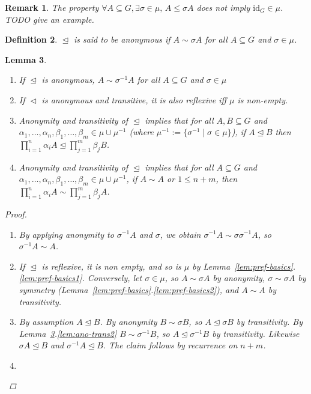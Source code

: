 \documentclass[11pt]{article}
\newtheorem{definition}{Definition}
\newtheorem{lemma}[definition]{Lemma}
\newtheorem{remark}[definition]{Remark}
\newcommand{\releq}{\mathrel{\trianglelefteq}}
\newcommand{\rel}{\mathrel{\triangleleft}}
\begin{document}
\begin{remark}
The property $\forall A \subseteq G, \exists \sigma \in \mu,\, A \leq \sigma A$ does not imply $\mathrm{id}_G \in \mu$. TODO give an example.
\end{remark}


\begin{definition}
 $\releq$ is said to be anonymous if $A \sim \sigma A$ for all $A \subseteq G$ and $\sigma \in \mu$.
\end{definition}


\begin{lemma}\label{lem:ano-trans}
\begin{enumerate}
 \item\label{lem:ano-trans1} If $\releq$ is anonymous, $A \sim \sigma^{-1}A$ for all $A \subseteq G$ and $\sigma \in \mu$

 \item\label{lem:ano-trans2} If $\rel$ is anonymous and transitive, it is also reflexive iff $\mu$ is non-empty.  
 
  \item\label{lem:ano-trans3} Anonymity and transitivity of $\releq$ implies that for all $A, B \subseteq G$ and $\alpha_1,\dots,\alpha_n,\beta_1,\dots, \beta_m \in \mu \cup \mu^{-1}$ (where $\mu^{-1} := \{\sigma^{-1} \mid \sigma \in \mu\}$), if $A \releq B$ then $\prod_{i =1}^n \alpha_i A \releq \prod_{j =1}^m \beta_j B$.
 
 \item\label{lem:ano-trans4} Anonymity and transitivity of $\releq$ implies that for all $A \subseteq G$ and $\alpha_1,\dots,\alpha_n,\beta_1,\dots, \beta_m \in \mu \cup \mu^{-1}$, if $A \sim A$ or $1 \leq n+m$, then $\prod_{i =1}^n \alpha_i A \sim \prod_{j =1}^m \beta_j A$.
 

\end{enumerate}
 \begin{proof}
\begin{enumerate}
 \item By applying anonymity to $\sigma^{-1}A$ and $\sigma$, we obtain $\sigma^{-1}A \sim \sigma \sigma^{-1}A$, so $\sigma^{-1}A \sim A$.
 
 \item If $\releq$ is reflexive, it is non empty, and so is $\mu$ by Lemma~\ref{lem:pref-basics}.\ref{lem:pref-basics1}. Conversely, let $\sigma \in \mu$, so $A \sim \sigma A$ by anonymity, $\sigma \sim \sigma A$ by symmetry (Lemma~\ref{lem:pref-basics}.\ref{lem:pref-basics2}), and $A \sim A$ by transitivity.
 
 \item By assumption $A \releq B$. By anonymity $B \sim \sigma B$, so $A \releq \sigma B$ by transitivity. By Lemma~\ref{lem:ano-trans}.\ref{lem:ano-trans2} $B \sim \sigma^{-1} B$, so $A \releq \sigma^{-1} B$ by transitivity. Likewise $\sigma A \releq B$ and $\sigma^{-1} A \releq B$. The claim follows by recurrence on $n+m$. 
 
 \item 
\end{enumerate}
\end{proof}
 
\end{lemma}
\end{document}
